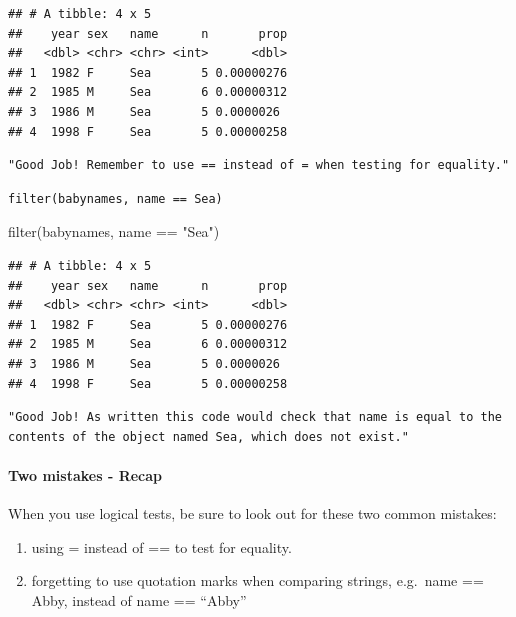 \documentclass[
]{article}
\newenvironment{Shaded}{\begin{snugshade}}{\end{snugshade}}
\newcommand{\FunctionTok}[1]{\textcolor[rgb]{0.00,0.00,0.00}{#1}}
\newcommand{\NormalTok}[1]{#1}
\newcommand{\SpecialCharTok}[1]{\textcolor[rgb]{0.00,0.00,0.00}{#1}}
\newcommand{\StringTok}[1]{\textcolor[rgb]{0.31,0.60,0.02}{#1}}
\providecommand{\tightlist}{%
  \setlength{\itemsep}{0pt}\setlength{\parskip}{0pt}}
\begin{document}
\begin{verbatim}
## # A tibble: 4 x 5
##    year sex   name      n       prop
##   <dbl> <chr> <chr> <int>      <dbl>
## 1  1982 F     Sea       5 0.00000276
## 2  1985 M     Sea       6 0.00000312
## 3  1986 M     Sea       5 0.0000026 
## 4  1998 F     Sea       5 0.00000258
\end{verbatim}

\begin{verbatim}
"Good Job! Remember to use == instead of = when testing for equality."
\end{verbatim}

\begin{verbatim}
filter(babynames, name == Sea)
\end{verbatim}

\begin{Shaded}
\begin{Highlighting}[]
\FunctionTok{filter}\NormalTok{(babynames, name }\SpecialCharTok{==} \StringTok{"Sea"}\NormalTok{)}
\end{Highlighting}
\end{Shaded}

\begin{verbatim}
## # A tibble: 4 x 5
##    year sex   name      n       prop
##   <dbl> <chr> <chr> <int>      <dbl>
## 1  1982 F     Sea       5 0.00000276
## 2  1985 M     Sea       6 0.00000312
## 3  1986 M     Sea       5 0.0000026 
## 4  1998 F     Sea       5 0.00000258
\end{verbatim}

\begin{verbatim}
"Good Job! As written this code would check that name is equal to the contents of the object named Sea, which does not exist."
\end{verbatim}

\hypertarget{two-mistakes---recap}{%
\paragraph{Two mistakes - Recap}\label{two-mistakes---recap}}

When you use logical tests, be sure to look out for these two common
mistakes:

\begin{enumerate}
\def\labelenumi{\arabic{enumi}.}
\tightlist
\item
  using = instead of == to test for equality.
\item
  forgetting to use quotation marks when comparing strings, e.g.~name ==
  Abby, instead of name == ``Abby''
\end{enumerate}
\end{document}
